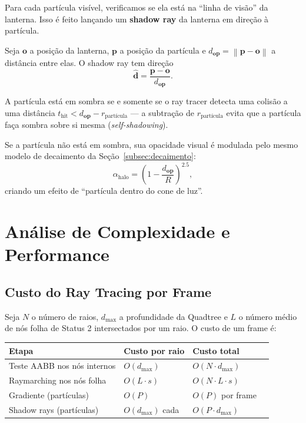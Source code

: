 \documentclass[11pt,a4paper]{article}
\theoremstyle{plain}
\theoremstyle{definition}
\newcommand{\vv}[1]{\mathbf{#1}}
\newcommand{\norm}[1]{\left\|#1\right\|}
\begin{document}
Para cada partícula visível, verificamos se ela está na ``linha de visão'' da
lanterna. Isso é feito lançando um \textbf{shadow ray} da lanterna em direção
à partícula.

Seja $\vv{o}$ a posição da lanterna, $\vv{p}$ a posição da partícula e
$d_{\vv{op}} = \norm{\vv{p} - \vv{o}}$ a distância entre elas. O shadow ray
tem direção
\[
    \hat{\vv{d}} = \frac{\vv{p} - \vv{o}}{d_{\vv{op}}}.
\]

A partícula está em sombra se e somente se o ray tracer detecta uma colisão a
uma distância $t_{\text{hit}} < d_{\vv{op}} - r_{\text{partícula}}$ --- a
subtração de $r_{\text{partícula}}$ evita que a partícula faça sombra sobre si
mesma (\textit{self-shadowing}).

Se a partícula não está em sombra, sua opacidade visual é modulada pelo mesmo
modelo de decaimento da Seção~\ref{subsec:decaimento}:
\[
    \alpha_{\text{halo}} = \left(1 - \frac{d_{\vv{op}}}{R}\right)^{2.5},
\]
criando um efeito de ``partícula dentro do cone de luz''.

\section{Análise de Complexidade e Performance}
\label{sec:complexidade}

\subsection{Custo do Ray Tracing por Frame}

Seja $N$ o número de raios, $d_{\max}$ a profundidade da Quadtree e $L$ o número
médio de nós folha de Status 2 intersectados por um raio. O custo de um frame é:

\begin{center}
\begin{tabular}{llll}
\toprule
\textbf{Etapa} & \textbf{Custo por raio} & \textbf{Custo total} \\
\midrule
Teste AABB nos nós internos   & $O(d_{\max})$        & $O(N \cdot d_{\max})$       \\
Raymarching nos nós folha     & $O(L \cdot s)$       & $O(N \cdot L \cdot s)$      \\
Gradiente (partículas)        & $O(P)$               & $O(P)$ por frame            \\
Shadow rays (partículas)      & $O(d_{\max})$ cada   & $O(P \cdot d_{\max})$       \\
\bottomrule
\end{tabular}
\end{center}
\end{document}
